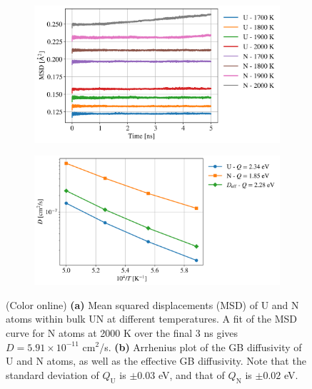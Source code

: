 \documentclass[preprint, 12pt]{elsarticle}
\newcommand{\?}{\stackrel{?}{=}}
\begin{document}
\begin{figure}[h!]
\centering
\begin{subfigure}{0.48\textwidth}
    \includegraphics[width=\textwidth]{LatticeDiffusion.png}
    \caption{}
    \label{Fig:LatDiff}
\end{subfigure}
\hfill
\begin{subfigure}{0.48\textwidth}
    \includegraphics[width=\textwidth]{GBDiffusion.png}
    \caption{}
    \label{Fig:GBDiff}
\end{subfigure}
\caption{(Color online) \textbf{(a)} Mean squared displacements (MSD) of U and N atoms within bulk UN at different temperatures. A fit of the MSD curve for N atoms at 2000 K over the final 3 ns gives $D = 5.91 \times 10^{-11}$ cm$^2$/s. \textbf{(b)} Arrhenius plot of the GB diffusivity of U and N atoms, as well as the effective GB diffusivity. Note that the standard deviation of $Q_\mathrm{U}$ is $\pm 0.03$ eV, and that of $Q_\mathrm{N}$ is $\pm 0.02$ eV.}
\label{Fig:Diff}
\end{figure}
\end{document}
